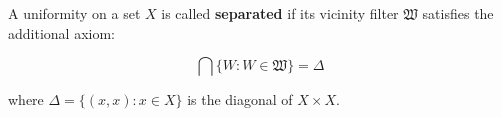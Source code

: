 A uniformity on a set $X$ is called \textbf{separated} if its vicinity filter $\mathfrak{W}$ satisfies the additional axiom:

\[
\bigcap \{W : W \in \mathfrak{W}\} = \Delta
\]

where $\Delta = \{(x,x) : x \in X\}$ is the diagonal of $X \times X$.
